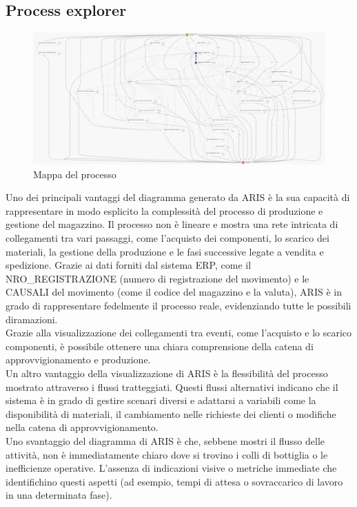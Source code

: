\documentclass{article}
\begin{document}
\subsection{Process explorer}
\begin{figure}[H]
    \centering
    \includegraphics[width=\textwidth]{imgARIS/DatiReali/ProcessExplorerDatiReali.png}
    \caption{Mappa del processo}
    \label{fig:process-map}
\end{figure}
Uno dei principali vantaggi del diagramma generato da ARIS è la sua capacità di rappresentare in modo esplicito la complessità del processo di produzione e gestione del magazzino. Il processo non è lineare e mostra una rete intricata di collegamenti tra vari passaggi, come l’acquisto dei componenti, lo scarico dei materiali, la gestione della produzione e le fasi successive legate a vendita e spedizione. Grazie ai dati forniti dal sistema ERP, come il NRO\_REGISTRAZIONE (numero di registrazione del movimento) e le CAUSALI del movimento (come il codice del magazzino e la valuta), ARIS è in grado di rappresentare fedelmente il processo reale, evidenziando tutte le possibili diramazioni.\\
Grazie alla visualizzazione dei collegamenti tra eventi, come l'acquisto e lo scarico componenti, è possibile ottenere una chiara comprensione della catena di approvvigionamento e produzione.\\
Un altro vantaggio della visualizzazione di ARIS è la flessibilità del processo mostrato attraverso i flussi tratteggiati. Questi flussi alternativi indicano che il sistema è in grado di gestire scenari diversi e adattarsi a variabili come la disponibilità di materiali, il cambiamento nelle richieste dei clienti o modifiche nella catena di approvvigionamento.\\
Uno svantaggio del diagramma di ARIS è che, sebbene mostri il flusso delle attività, non è immediatamente chiaro dove si trovino i colli di bottiglia o le inefficienze operative. L'assenza di indicazioni visive o metriche immediate che identifichino questi aspetti (ad esempio, tempi di attesa o sovraccarico di lavoro in una determinata fase).\\
\end{document}
